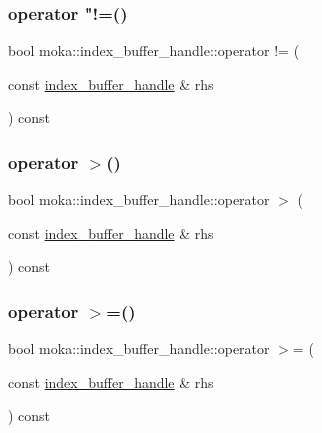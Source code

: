 \subsubsection{\texorpdfstring{operator "!=()}{operator !=()}}
{\footnotesize\ttfamily bool moka\+::index\+\_\+buffer\+\_\+handle\+::operator != (\begin{DoxyParamCaption}\item[{const \mbox{\hyperlink{structmoka_1_1index__buffer__handle}{index\+\_\+buffer\+\_\+handle}} \&}]{rhs }\end{DoxyParamCaption}) const}

\mbox{\label{structmoka_1_1index__buffer__handle_af18da67f3c77a6249f2f8e82beff9084}} 
\subsubsection{\texorpdfstring{operator $>$()}{operator >()}}
{\footnotesize\ttfamily bool moka\+::index\+\_\+buffer\+\_\+handle\+::operator $>$ (\begin{DoxyParamCaption}\item[{const \mbox{\hyperlink{structmoka_1_1index__buffer__handle}{index\+\_\+buffer\+\_\+handle}} \&}]{rhs }\end{DoxyParamCaption}) const}

\mbox{\label{structmoka_1_1index__buffer__handle_a04ac6ce4300d17d22ff081ded3afd661}} 
\subsubsection{\texorpdfstring{operator $>$=()}{operator >=()}}
{\footnotesize\ttfamily bool moka\+::index\+\_\+buffer\+\_\+handle\+::operator $>$= (\begin{DoxyParamCaption}\item[{const \mbox{\hyperlink{structmoka_1_1index__buffer__handle}{index\+\_\+buffer\+\_\+handle}} \&}]{rhs }\end{DoxyParamCaption}) const}

